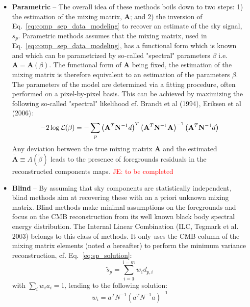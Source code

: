 \begin{itemize}
	\item \textbf{Parametric} -- The overall idea of these methods boils down to two steps: 1) the estimation of the mixing matrix, $\mathbf{A}$; and 2) the inversion of Eq.~\ref{eq:comp_sep_data_modeling} to recover an estimate of the sky signal, $s_p$.
	Parametric methods assumes that the mixing matrix, used in Eq.~\ref{eq:comp_sep_data_modeling}, has a functional form which is known and which can be parametrized by so-called "spectral" parameters $\beta$ i.e. $\mathbf{A} = \mathbf{A}(\beta)$. The functional form of $\mathbf{A}$ being fixed, the estimation of the mixing matrix is therefore equivalent to an estimation of the parameters $\beta$. The parameters of the model are determined via a fitting procedure, often performed on a pixel-by-pixel basis. This can be achieved by maximizing the following so-called "spectral" likelihood cf. Brandt et al (1994), Eriksen et al (2006):
	\begin{eqnarray}
		\centering
			-2\log \mathcal{L}(\beta) = - \sum_p \left( \mathbf{A}^T\mathbf{N}^{-1} d\right)^T\left( \mathbf{A}^T\mathbf{N}^{-1} \mathbf{A}\right)^{-1}\left( \mathbf{A}^T\mathbf{N}^{-1} d\right)
	\end{eqnarray}
Any deviation between the true mixing matrix $\mathbf{A}$ and the estimated $\mathbf{\tilde A} \equiv A(\tilde \beta)$ leads to the presence of foregrounds residuals in the reconstructed components maps.
	\textcolor{red}{JE: to be completed}\\
	\item \textbf{Blind} -- By assuming that sky components are statistically independent, blind methods aim at recovering these with an a priori unknown mixing matrix. Blind methods make minimal assumptions on the foregrounds and focus on the CMB reconstruction from its well known black body spectral energy distribution. The Internal Linear Combination (ILC, Tegmark et al. 2003) belongs to this class of methods. It only uses the CMB column of the mixing matrix elements (noted $a$ hereafter) to perform the minimum variance reconstruction, cf. Eq.~\ref{eq:sp_solution}:
\begin{equation}
  \tilde s_p = \sum_{i=0}^{i=m} w_i d_{p,i}
\end{equation}
with $\sum_i  w_i a_i = 1$, leading to the following solution:
\begin{equation}
  w_i = a^T N^{-1} (a^TN^{-1} a)^{-1}
\end{equation}


\end{itemize}
